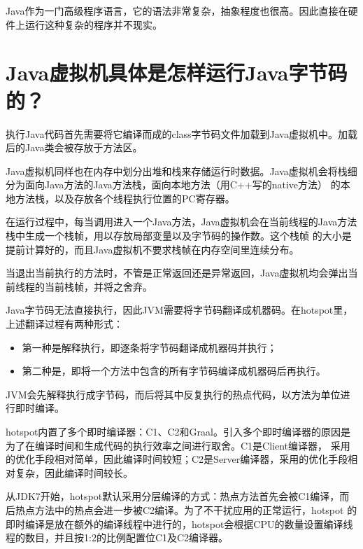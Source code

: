 \documentclass{template}
\begin{document}
\ttfamily

Java作为一门高级程序语言，它的语法非常复杂，抽象程度也很高。因此直接在硬件上运行这种复杂的程序并不现实。

\section*{Java虚拟机具体是怎样运行Java字节码的？}
    执行Java代码首先需要将它编译而成的class字节码文件加载到Java虚拟机中。加载后的Java类会被存放于方法区。

    Java虚拟机同样也在内存中划分出堆和栈来存储运行时数据。Java虚拟机会将栈细分为面向Java方法的Java方法栈，面向本地方法（用C++写的native方法）
    的本地方法栈，以及存放各个线程执行位置的PC寄存器。

    在运行过程中，每当调用进入一个Java方法，Java虚拟机会在当前线程的Java方法栈中生成一个栈帧，用以存放局部变量以及字节码的操作数。这个栈帧
    的大小是提前计算好的，而且Java虚拟机不要求栈帧在内存空间里连续分布。

    当退出当前执行的方法时，不管是正常返回还是异常返回，Java虚拟机均会弹出当前线程的当前栈帧，并将之舍弃。

    Java字节码无法直接执行，因此JVM需要将字节码翻译成机器码。在hotspot里，上述翻译过程有两种形式：
    \begin{itemize}
        \item 第一种是解释执行，即逐条将字节码翻译成机器码并执行；
        \item 第二种是，即将一个方法中包含的所有字节码编译成机器码后再执行。
    \end{itemize}
    JVM会先解释执行成字节码，而后将其中反复执行的热点代码，以方法为单位进行即时编译。

    hotspot内置了多个即时编译器：C1、C2和Graal。引入多个即时编译器的原因是为了在编译时间和生成代码的执行效率之间进行取舍。C1是Client编译器，
    采用的优化手段相对简单，因此编译时间较短；C2是Server编译器，采用的优化手段相对复杂，因此编译时间较长。

    从JDK7开始，hotspot默认采用分层编译的方式：热点方法首先会被C1编译，而后热点方法中的热点会进一步被C2编译。为了不干扰应用的正常运行，hotspot
    的即时编译是放在额外的编译线程中进行的，hotspot会根据CPU的数量设置编译线程的数目，并且按1:2的比例配置位C1及C2编译器。

\section{}
\end{document}
